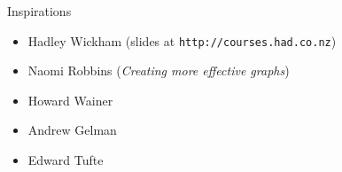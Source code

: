 \documentclass[12pt]{article}\usepackage[]{graphicx}\usepackage[]{color}
\newcommand{\headsize}{\fontsize{35}{35} \selectfont}
\newcommand{\smallersize}{\fontsize{20}{25} \selectfont}
\newcommand{\smallestsize}{\fontsize{18}{22} \selectfont}
\begin{document}
\newpage





\headsize \color{myyellow}
\hfill
\begin{minipage}{5.75in}
\centering
Inspirations
\end{minipage}

\vspace{30mm}

\smallersize \color{mywhite}
\hspace{0.5in} \begin{minipage}{9.5in}

\begin{itemize}
\item Hadley Wickham
{\smallestsize \color{myblue}
(slides at \verb|http://courses.had.co.nz|)}

\item Naomi Robbins
{\smallestsize \color{myblue}
(\emph{Creating more effective graphs})}

\item Howard Wainer

\item Andrew Gelman

\item Edward Tufte

\end{itemize}

\end{minipage}
\end{document}
